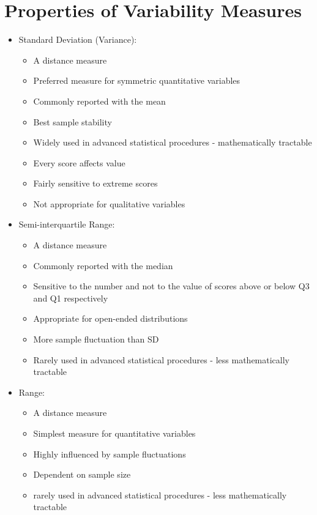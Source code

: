 \documentclass[12pt]{article}
\begin{document}
\section{Properties of Variability
Measures}\label{properties-of-variability-measures}

\begin{itemize}
\itemsep1pt\parskip0pt
\item
  Standard Deviation (Variance):

  \begin{itemize}
  \itemsep1pt\parskip0pt
  \item
    A distance measure
  \item
    Preferred measure for symmetric quantitative variables
  \item
    Commonly reported with the mean
  \item
    Best sample stability
  \item
    Widely used in advanced statistical procedures - mathematically
    tractable
  \item
    Every score affects value
  \item
    Fairly sensitive to extreme scores
  \item
    Not appropriate for qualitative variables
  \end{itemize}
\item
  Semi-interquartile Range:

  \begin{itemize}
  \itemsep1pt\parskip0pt
  \item
    A distance measure
  \item
    Commonly reported with the median
  \item
    Sensitive to the number and not to the value of scores above or
    below Q3 and Q1 respectively
  \item
    Appropriate for open-ended distributions
  \item
    More sample fluctuation than SD
  \item
    Rarely used in advanced statistical procedures - less mathematically
    tractable
  \end{itemize}
\item
  Range:

  \begin{itemize}
  \itemsep1pt\parskip0pt
  \item
    A distance measure
  \item
    Simplest measure for quantitative variables
  \item
    Highly influenced by sample fluctuations
  \item
    Dependent on sample size
  \item
    rarely used in advanced statistical procedures - less mathematically
    tractable
  \end{itemize}
\end{itemize}
\end{document}
